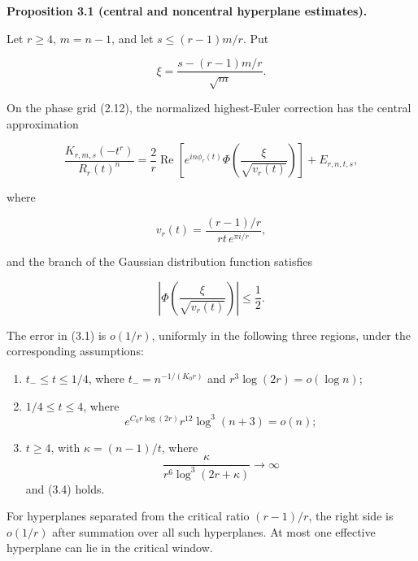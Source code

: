 \documentclass[10pt]{article}
\newenvironment{mdstatement}[1]
  {\par\Needspace{0.16\textheight}\noindent\textbf{#1.}\ \itshape}
  {\par\normalfont}
\begin{document}
\begin{mdstatement}{Proposition 3.1 (central and noncentral hyperplane estimates)}


Let $r\ge4$, $m=n-1$, and let $s\le (r-1)m/r$.  Put

\[
 \xi=\frac{s-(r-1)m/r}{\sqrt m}.
\]

On the phase grid (2.12), the normalized highest-Euler correction has the
central approximation

\[
 \frac{K_{r,m,s}(-t^r)}{R_r(t)^n}
 =\frac2r\operatorname{Re}\left[
 e^{in\phi_r(t)}
 \Phi\left(\frac{\xi}{\sqrt{v_r(t)}}\right)
 \right]+E_{r,n,t,s}, \tag{3.1}
\]

where

\[
 v_r(t)=\frac{(r-1)/r}{rt\,e^{\pi i/r}}, \tag{3.2}
\]

and the branch of the Gaussian distribution function satisfies

\[
 \left|\Phi\left(\frac{\xi}{\sqrt{v_r(t)}}\right)\right|\le\frac12.
 \tag{3.3}
\]

The error in (3.1) is $o(1/r)$, uniformly in the following three regions,
under the corresponding assumptions:

\begin{enumerate}
\item $t_-\le t\le1/4$, where
$t_-=n^{-1/(K_0r)}$ and $r^3\log(2r)=o(\log n)$;
\item $1/4\le t\le4$, where
\[
e^{C_0r\log(2r)}r^{12}\log^3(n+3)=o(n); \tag{3.4}
\]
\item $t\ge4$, with $\kappa=(n-1)/t$, where
\[
\frac{\kappa}{r^6\log^3(2r+\kappa)}\longrightarrow\infty
\tag{3.5}
\]
and (3.4) holds.
\end{enumerate}

For hyperplanes separated from the critical ratio $(r-1)/r$, the right
side is $o(1/r)$ after summation over all such hyperplanes.  At most one
effective hyperplane can lie in the critical window.

\end{mdstatement}
\end{document}
